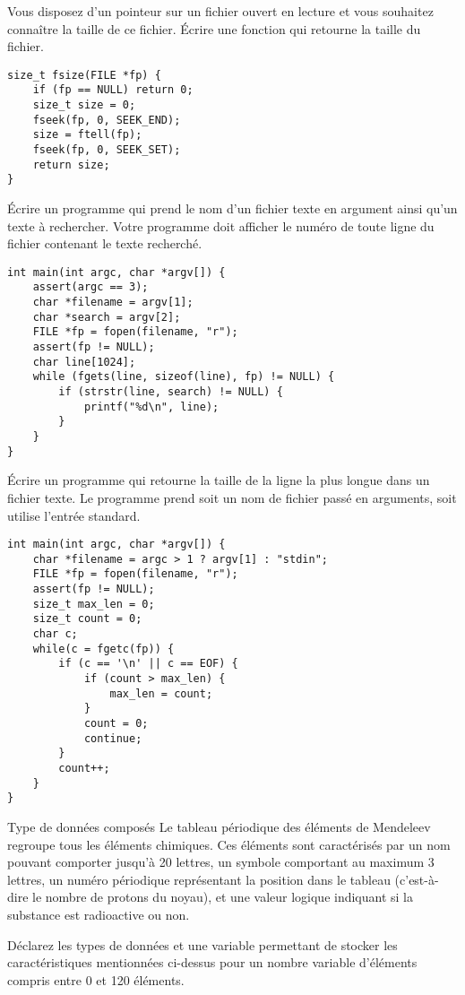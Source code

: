 \documentclass[french,a4paper,addpoints,11pt]{exam}
\begin{document}
\begin{questions}
\question Vous disposez d'un pointeur sur un fichier ouvert en lecture  et vous souhaitez connaître la taille de ce fichier. Écrire une fonction  qui retourne la taille du fichier.

\begin{solutionordottedlines}[7cm]
\begin{lstlisting}
size_t fsize(FILE *fp) {
    if (fp == NULL) return 0;
    size_t size = 0;
    fseek(fp, 0, SEEK_END);
    size = ftell(fp);
    fseek(fp, 0, SEEK_SET);
    return size;
}
\end{lstlisting}
\end{solutionordottedlines}

\question Écrire un programme qui prend le nom d'un fichier texte en argument ainsi qu'un texte à rechercher. Votre programme doit afficher le numéro de toute ligne du fichier contenant le texte recherché.

\begin{solutionordottedlines}[10cm]
\begin{lstlisting}
int main(int argc, char *argv[]) {
    assert(argc == 3);
    char *filename = argv[1];
    char *search = argv[2];
    FILE *fp = fopen(filename, "r");
    assert(fp != NULL);
    char line[1024];
    while (fgets(line, sizeof(line), fp) != NULL) {
        if (strstr(line, search) != NULL) {
            printf("%d\n", line);
        }
    }
}
\end{lstlisting}
\end{solutionordottedlines}

\question Écrire un programme qui retourne la taille de la ligne la plus longue dans un fichier texte. Le programme prend soit un nom de fichier passé en arguments, soit utilise l'entrée standard.

\begin{solutionordottedlines}[10cm]
\begin{lstlisting}
int main(int argc, char *argv[]) {
    char *filename = argc > 1 ? argv[1] : "stdin";
    FILE *fp = fopen(filename, "r");
    assert(fp != NULL);
    size_t max_len = 0;
    size_t count = 0;
    char c;
    while(c = fgetc(fp)) {
        if (c == '\n' || c == EOF) {
            if (count > max_len) {
                max_len = count;
            }
            count = 0;
            continue;
        }
        count++;
    }
}
\end{lstlisting}
\end{solutionordottedlines}

\question Type de données composés
Le tableau périodique des éléments de Mendeleev regroupe tous les éléments chimiques. Ces éléments sont caractérisés par un nom pouvant comporter jusqu'à 20 lettres, un symbole comportant au maximum 3 lettres, un numéro périodique représentant la position dans le tableau (c'est-à-dire le nombre de protons du noyau), et une valeur logique indiquant si la substance est radioactive ou non.

Déclarez les types de données et une variable permettant de stocker les caractéristiques mentionnées ci-dessus pour un nombre variable d'éléments compris entre 0 et 120 éléments.

\end{questions}
\end{document}
